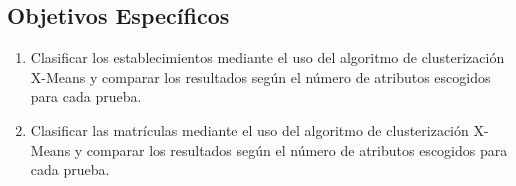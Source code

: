\subsection{Objetivos Específicos}
\begin{enumerate}
\item Clasificar los establecimientos mediante el uso del algoritmo de clusterización X-Means y comparar los resultados según el número de atributos escogidos para cada prueba.
\item Clasificar las matrículas mediante el uso del algoritmo de clusterización X-Means y comparar los resultados según el número de atributos escogidos para cada prueba.
\end{enumerate}